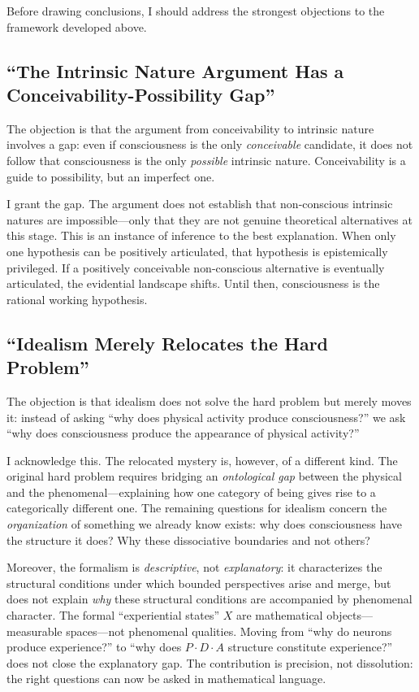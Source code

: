 \documentclass[11pt,a4paper]{article}
\theoremstyle{definition}
\theoremstyle{plain}
\theoremstyle{remark}
\begin{document}
Before drawing conclusions, I should address the strongest objections to the framework developed above.

\subsection{``The Intrinsic Nature Argument Has a Conceivability-Possibility Gap''}\label{sec:gap}

The objection is that the argument from conceivability to intrinsic nature involves a gap: even if consciousness is the only \textit{conceivable} candidate, it does not follow that consciousness is the only \textit{possible} intrinsic nature. Conceivability is a guide to possibility, but an imperfect one.

I grant the gap. The argument does not establish that non-conscious intrinsic natures are impossible---only that they are not genuine theoretical alternatives at this stage. This is an instance of inference to the best explanation. When only one hypothesis can be positively articulated, that hypothesis is epistemically privileged. If a positively conceivable non-conscious alternative is eventually articulated, the evidential landscape shifts. Until then, consciousness is the rational working hypothesis.

\subsection{``Idealism Merely Relocates the Hard Problem''}\label{sec:relocates}

The objection is that idealism does not solve the hard problem but merely moves it: instead of asking ``why does physical activity produce consciousness?'' we ask ``why does consciousness produce the appearance of physical activity?''

I acknowledge this. The relocated mystery is, however, of a different kind. The original hard problem requires bridging an \textit{ontological gap} between the physical and the phenomenal---explaining how one category of being gives rise to a categorically different one. The remaining questions for idealism concern the \textit{organization} of something we already know exists: why does consciousness have the structure it does? Why these dissociative boundaries and not others?

Moreover, the formalism is \textit{descriptive}, not \textit{explanatory}: it characterizes the structural conditions under which bounded perspectives arise and merge, but does not explain \textit{why} these structural conditions are accompanied by phenomenal character. The formal ``experiential states'' $X$ are mathematical objects---measurable spaces---not phenomenal qualities. Moving from ``why do neurons produce experience?'' to ``why does $P \cdot D \cdot A$ structure constitute experience?'' does not close the explanatory gap. The contribution is precision, not dissolution: the right questions can now be asked in mathematical language.
\end{document}
